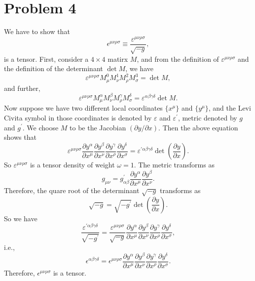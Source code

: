 \documentclass{article}
\begin{document}
\section*{Problem 4}
We have to show that 
\begin{equation}
    \epsilon^{\mu \nu \rho \sigma} \equiv \frac{\varepsilon^{\mu \nu \rho \sigma}}{\sqrt{-g}},
\end{equation}
is a tensor.
First, consider a $4 \times 4$ matirx $M$, and from the definition of $\varepsilon^{\mu\nu\rho\sigma}$
and the definition of the determinant $\det M$, we have
\begin{equation}
    \varepsilon^{\mu \nu \rho \sigma} M^0_\mu M^1_\nu M^2_\rho M^3_\sigma = \det M,
\end{equation}
and further,
\begin{equation}
    \varepsilon^{\mu \nu \rho \sigma} M^\alpha_\mu M^\beta_\nu M^\gamma_\rho M^\delta_\sigma 
    = \varepsilon^{\alpha \beta \gamma \delta} \det M.
\end{equation}
Now suppose we have two different local coordinates $\{x^\mu\}$ and $\{y^\mu\}$,
and the Levi Civita symbol in those coordinates is denoted by $\varepsilon$ and $\varepsilon^\prime$,
metric denoted by $g$ and $g^\prime$.
We choose $M$ to be the Jacobian $(\partial y/ \partial x)$.
Then the above equation shows that
\begin{equation}
    \varepsilon^{\mu \nu \rho \sigma}\frac{\partial y^\alpha}{\partial x^\mu}
    \frac{\partial y^\beta}{\partial x^\nu}\frac{\partial y^\gamma}{\partial x^\rho}
    \frac{\partial y^\delta}{\partial x^\sigma} = \varepsilon^{\prime\alpha \beta \gamma \delta} \det\left(\frac{\partial y}{\partial x}\right).
\end{equation}
So $\varepsilon^{\mu \nu \rho \sigma}$ is a tensor density of weight $\omega = 1$. 
The metric transforms as
\begin{equation}
    g_{\mu \nu} = g^\prime_{\alpha \beta} \frac{\partial y^\alpha}{\partial x^\mu}
    \frac{\partial y^\beta}{\partial x^\nu}.
\end{equation}
Therefore, the quare root of the determinant $\sqrt{-g}$ transforms as
\begin{equation}
    \sqrt{-g} = \sqrt{-g^\prime} \det\left(\frac{\partial y}{\partial x}\right).
\end{equation}
So we have 
\begin{equation}
\frac{\varepsilon^{\prime\alpha \beta \gamma \delta}}{\sqrt{-g^\prime}}
= \frac{\varepsilon^{\mu \nu \rho \sigma}}{\sqrt{-g}}
\frac{\partial y^\alpha}{\partial x^\mu}
\frac{\partial y^\beta}{\partial x^\nu}\frac{\partial y^\gamma}{\partial x^\rho}
\frac{\partial y^\delta}{\partial x^\sigma},
\end{equation}
i.e.,
\begin{equation}
\epsilon^{\alpha \beta \gamma \delta}
= \epsilon^{\mu \nu \rho \sigma}
\frac{\partial y^\alpha}{\partial x^\mu}
\frac{\partial y^\beta}{\partial x^\nu}\frac{\partial y^\gamma}{\partial x^\rho}
\frac{\partial y^\delta}{\partial x^\sigma}.
\end{equation}
Therefore, $\epsilon^{\mu \nu \rho \sigma}$ is a tensor.
\end{document}
